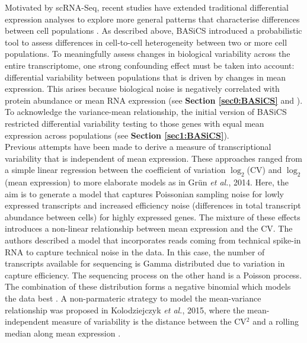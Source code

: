 Motivated by scRNA-Seq, recent studies have extended traditional differential expression analyses to explore more general patterns that characterise differences between cell populations \citep[e.g.~][]{Korthauer2016}. As described above, BASiCS \citep{Vallejos2015BASiCS,Vallejos2016} introduced a probabilistic tool to assess differences in cell-to-cell heterogeneity between two or more cell populations. To meaningfully assess changes in biological variability across the entire transcriptome, one strong confounding effect must be taken into account: differential variability between populations that is driven by changes in mean expression. This arises because biological noise is negatively correlated with protein abundance \citep{Bar-Even2006, Newman2006, Taniguchi2011} or mean RNA expression (see \textbf{Section \ref{sec0:BASiCS}} and \citep{Brennecke2013, Antolovic2017}). To acknowledge the variance-mean relationship, the initial version of BASiCS restricted differential variability testing to those genes with equal mean expression across populations (see \textbf{Section \ref{sec1:BASiCS}}). \\

Previous attempts have been made to derive a measure of transcriptional variability that is independent of mean expression. These approaches ranged from a simple linear regression between the coefficient of variation $\log_2$(CV) and $\log_2$(mean expression) \citep{Wu2017} to more elaborate models as in Gr\"un \emph{et al.}, 2014. Here, the aim is to generate a model that captures Poissonian sampling noise for lowly expressed transcripts and increased efficiency noise (differences in total transcript abundance between cells) for highly expressed genes. The mixture of these effects introduces a non-linear relationship between mean expression and the CV. The authors described a model that incorporates reads coming from technical spike-in RNA to capture technical noise in the data. In this case, the number of transcripts available for sequencing is Gamma distributed due to variation in capture efficiency. The sequencing process on the other hand is a Poisson process. The combination of these distribution forms a negative binomial which models the data best \cite{Grun2014}. A non-parmateric strategy to model the mean-variance relationship was proposed in Kolodziejczyk \emph{et al.}, 2015, where the mean-independent measure of variability is the distance between the CV$^2$ and a rolling median along mean expression \citep{Kolodziejczyk2015cell}.\\

